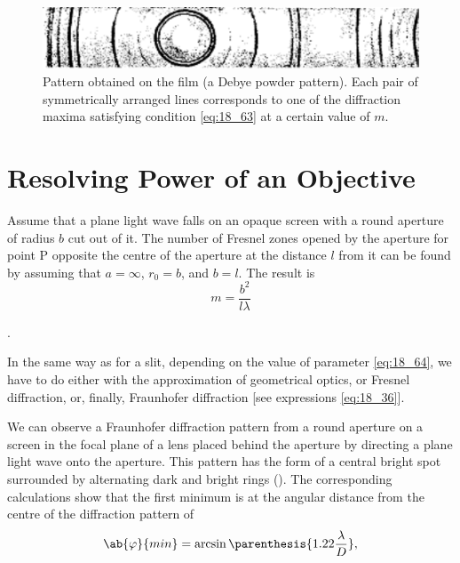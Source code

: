 \begin{figure}[t]
	\begin{center}
		\includegraphics[scale=1.0]{figures/ch_18/fig_18_46.pdf}
        \caption[]{Pattern obtained on the film (a Debye powder pattern). Each pair of symmetrically arranged lines corresponds to one of the diffraction maxima satisfying condition \eqref{eq:18_63} at a certain value of $m$.}
		\label{fig:18_46}
	\end{center}
	\vspace{-0.8cm}
\end{figure}

\section{Resolving Power of an Objective}\label{sec:18_8}

Assume that a plane light wave falls on an opaque screen with a round aperture of radius $b$ cut out of it.
The number of Fresnel zones opened by the aperture for point P opposite the centre of the
aperture at the distance $l$ from it can be found by  assuming that $a=\infty$, $r_0=b$, and $b=l$.
The result is
\begin{equation}\label{eq:18_64}
	m = \frac{b^2}{l \lambda}
\end{equation}

.

In the same way as for a slit, depending on the value of parameter \eqref{eq:18_64}, we have to do either with the approximation of geometrical optics, or Fresnel diffraction, or, finally, Fraunhofer diffraction [see expressions \eqref{eq:18_36}].

We can observe a Fraunhofer diffraction pattern from a round aperture on a screen in the focal plane of a lens placed behind the aperture by directing a plane light wave onto the aperture.
This pattern has the form of a central bright spot surrounded by alternating dark and bright rings ().
The corresponding calculations show that the first minimum is at the angular distance from the centre of the diffraction pattern of
\begin{equation}\label{eq:18_65}
	\ab{\varphi}{min} = \arcsin\parenthesis{1.22\frac{\lambda}{D}},
\end{equation}

